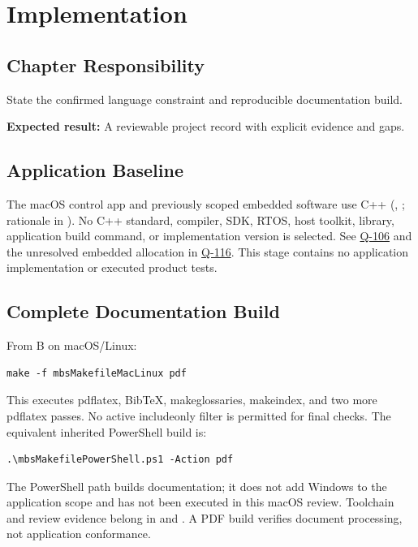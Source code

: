 \chapter{Implementation}
\section{Chapter Responsibility}
\label{Section:ImplementationResponsibility}
State the confirmed language constraint and reproducible documentation build.

\noindent\textbf{Expected result:} A reviewable project record with explicit evidence and gaps.


\section{Application Baseline}
The macOS control app and previously scoped embedded software use C++ (, ; rationale in ). No C++ standard, compiler, SDK, RTOS, host toolkit, library, application build command, or implementation version is selected. See \hyperref[Question:Q-106]{Q-106} and the unresolved embedded allocation in \hyperref[Question:Q-116]{Q-116}. This stage contains no application implementation or executed product tests.

\section{Complete Documentation Build}
From B on macOS/Linux:
\begin{verbatim}
make -f mbsMakefileMacLinux pdf
\end{verbatim}
This executes pdflatex, BibTeX, makeglossaries, makeindex, and two more pdflatex passes. No active includeonly filter is permitted for final checks. The equivalent inherited PowerShell build is:
\begin{verbatim}
.\mbsMakefilePowerShell.ps1 -Action pdf
\end{verbatim}
The PowerShell path builds documentation; it does not add Windows to the application scope and has not been executed in this macOS review. Toolchain and review evidence belong in  and . A PDF build verifies document processing, not application conformance.
